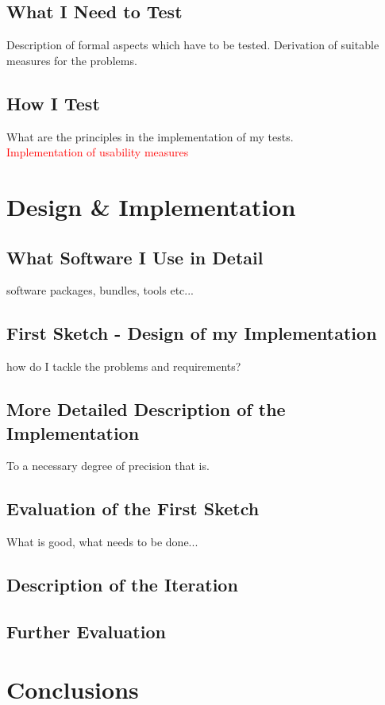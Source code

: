 \documentclass[12p]{scrartcl}
\begin{document}
\subsection{What I Need to Test}
Description of formal aspects which have to be tested. Derivation of suitable measures for the problems.
\subsection{How I Test}
What are the principles in the implementation of my tests.\\
\textcolor{red}{Implementation of usability measures}
 

\section{Design \& Implementation}
\subsection{What Software I Use in Detail}
software packages, bundles, tools etc...
\subsection{First Sketch - Design of my Implementation}
how do I tackle the problems and requirements?
\subsection{More Detailed Description of the Implementation}
To a necessary degree of precision that is.
\subsection{Evaluation of the First Sketch}
What is good, what needs to be done...
\subsection{Description of the Iteration}
\subsection{Further Evaluation}




\section{Conclusions}
\end{document}
